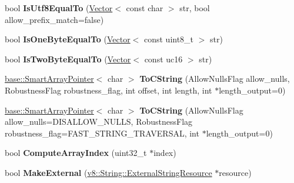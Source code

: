 \begin{DoxyCompactItemize}
\item 
bool {\bfseries Is\+Utf8\+Equal\+To} (\hyperlink{classv8_1_1internal_1_1_vector}{Vector}$<$ const char $>$ str, bool allow\+\_\+prefix\+\_\+match=false)\hypertarget{classv8_1_1internal_1_1_string_a736e8ab51faf13de279e4a9905f06a9b}{}\label{classv8_1_1internal_1_1_string_a736e8ab51faf13de279e4a9905f06a9b}

\item 
bool {\bfseries Is\+One\+Byte\+Equal\+To} (\hyperlink{classv8_1_1internal_1_1_vector}{Vector}$<$ const uint8\+\_\+t $>$ str)\hypertarget{classv8_1_1internal_1_1_string_a389361bf57fdc47c2955e0f36affd458}{}\label{classv8_1_1internal_1_1_string_a389361bf57fdc47c2955e0f36affd458}

\item 
bool {\bfseries Is\+Two\+Byte\+Equal\+To} (\hyperlink{classv8_1_1internal_1_1_vector}{Vector}$<$ const uc16 $>$ str)\hypertarget{classv8_1_1internal_1_1_string_a92b45dd0f7a9ab49cc053cf0e913e108}{}\label{classv8_1_1internal_1_1_string_a92b45dd0f7a9ab49cc053cf0e913e108}

\item 
\hyperlink{classv8_1_1base_1_1_smart_array_pointer}{base\+::\+Smart\+Array\+Pointer}$<$ char $>$ {\bfseries To\+C\+String} (Allow\+Nulls\+Flag allow\+\_\+nulls, Robustness\+Flag robustness\+\_\+flag, int offset, int length, int $\ast$length\+\_\+output=0)\hypertarget{classv8_1_1internal_1_1_string_a0ab6321ee77a35a0759f393b9272b0f7}{}\label{classv8_1_1internal_1_1_string_a0ab6321ee77a35a0759f393b9272b0f7}

\item 
\hyperlink{classv8_1_1base_1_1_smart_array_pointer}{base\+::\+Smart\+Array\+Pointer}$<$ char $>$ {\bfseries To\+C\+String} (Allow\+Nulls\+Flag allow\+\_\+nulls=D\+I\+S\+A\+L\+L\+O\+W\+\_\+\+N\+U\+L\+LS, Robustness\+Flag robustness\+\_\+flag=F\+A\+S\+T\+\_\+\+S\+T\+R\+I\+N\+G\+\_\+\+T\+R\+A\+V\+E\+R\+S\+AL, int $\ast$length\+\_\+output=0)\hypertarget{classv8_1_1internal_1_1_string_ab029d2ec67619ef66f85c148153d8d66}{}\label{classv8_1_1internal_1_1_string_ab029d2ec67619ef66f85c148153d8d66}

\item 
bool {\bfseries Compute\+Array\+Index} (uint32\+\_\+t $\ast$index)\hypertarget{classv8_1_1internal_1_1_string_a46b7030df3a7c7205e72ba4bc2eb3fdc}{}\label{classv8_1_1internal_1_1_string_a46b7030df3a7c7205e72ba4bc2eb3fdc}

\item 
bool {\bfseries Make\+External} (\hyperlink{classv8_1_1_string_1_1_external_string_resource}{v8\+::\+String\+::\+External\+String\+Resource} $\ast$resource)\hypertarget{classv8_1_1internal_1_1_string_a8b6bd85bd67adbe826a3743eb67f180d}{}\label{classv8_1_1internal_1_1_string_a8b6bd85bd67adbe826a3743eb67f180d}


\end{DoxyCompactItemize}
